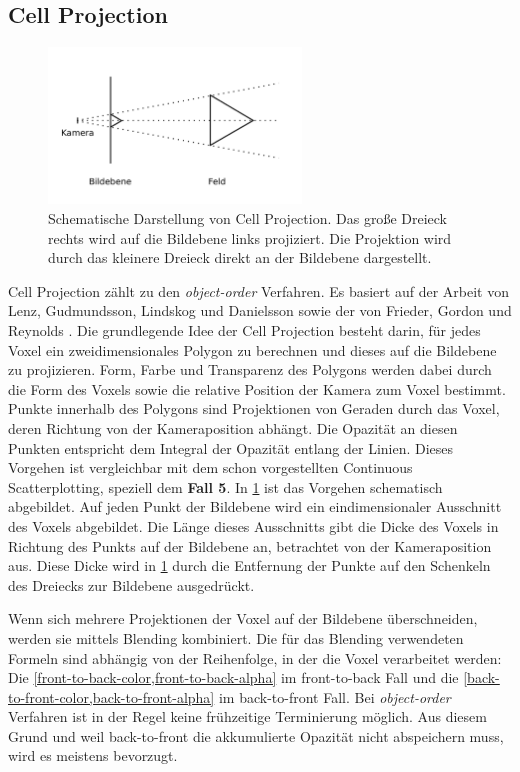 \documentclass[a4paper,fontsize=12pt,toc=bib,parskip=half,ngerman]{scrartcl}
\begin{document}
\subsection{Cell Projection}
\begin{figure}
	\centering
	\includegraphics[width=0.6\textwidth]{pictures/CellProjection}
	\caption{Schematische Darstellung von Cell Projection. Das gro{\ss}e Dreieck rechts wird auf die Bildebene links projiziert. Die Projektion wird durch das kleinere Dreieck direkt an der Bildebene dargestellt.}
	\label{CellProjection}
\end{figure}
Cell Projection z\"ahlt zu den \textit{object-order} Verfahren. Es basiert auf der Arbeit von Lenz, Gudmundsson, Lindskog und Danielsson \cite{lenz86display} sowie der von Frieder, Gordon und Reynolds \cite{frieder1985back}. Die grundlegende Idee der Cell Projection besteht darin, f\"ur jedes Voxel ein zweidimensionales Polygon zu berechnen und dieses auf die Bildebene zu projizieren. Form, Farbe und Transparenz des Polygons werden dabei durch die Form des Voxels sowie die relative Position der Kamera zum Voxel bestimmt. Punkte innerhalb des Polygons sind Projektionen von Geraden durch das Voxel, deren Richtung von der Kameraposition abh\"angt. Die Opazit\"at an diesen Punkten entspricht dem Integral der Opazit\"at entlang der Linien. Dieses Vorgehen ist vergleichbar mit dem schon vorgestellten Continuous Scatterplotting, speziell dem \textbf{Fall 5}. In \cref{CellProjection} ist das Vorgehen schematisch abgebildet. Auf jeden Punkt der Bildebene wird ein eindimensionaler Ausschnitt des Voxels abgebildet. Die L\"ange dieses Ausschnitts gibt die Dicke des Voxels in Richtung des Punkts auf der Bildebene an, betrachtet von der Kameraposition aus. Diese Dicke wird in \cref{CellProjection} durch die Entfernung der Punkte auf den Schenkeln des Dreiecks zur Bildebene ausgedr\"uckt.

Wenn sich mehrere Projektionen der Voxel auf der Bildebene \"uberschneiden, werden sie mittels Blending kombiniert. Die f\"ur das Blending verwendeten Formeln sind abh\"angig von der Reihenfolge, in der die Voxel verarbeitet werden: Die \cref{front-to-back-color,front-to-back-alpha} im front-to-back Fall und die \cref{back-to-front-color,back-to-front-alpha} im back-to-front Fall. Bei \textit{object-order} Verfahren ist in der Regel keine fr\"uhzeitige Terminierung m\"oglich. Aus diesem Grund und weil back-to-front die akkumulierte Opazit\"at nicht abspeichern muss, wird es meistens bevorzugt.
\end{document}
